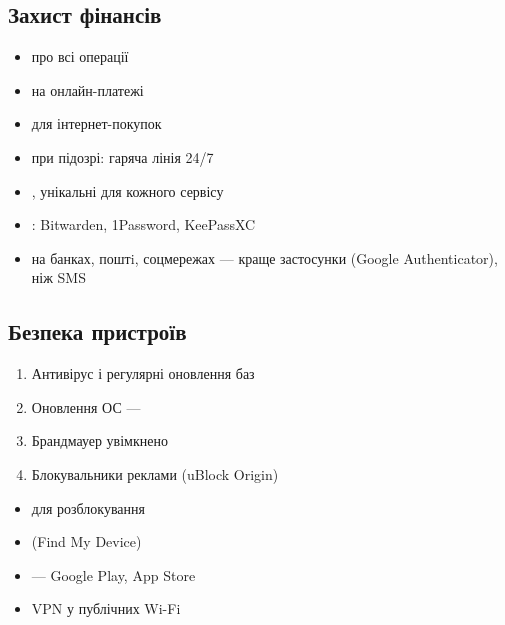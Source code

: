 \subsection*{Захист фінансів}

\begin{itemize}[label=--]
\item {} про всі операції
\item {} на онлайн-платежі
\item {} для інтернет-покупок
\item {} при підозрі: гаряча лінія 24/7
\end{itemize}

\begin{itemize}[label=--]
\item {}, унікальні для кожного сервісу
\item {}: Bitwarden, 1Password, KeePassXC
\item {} на банках, поштi, соцмережах — краще застосунки (Google Authenticator), ніж SMS
\end{itemize}

\subsection*{Безпека пристроїв}

\begin{enumerate}[label=\arabic*)]
\item Антивірус і регулярні оновлення баз
\item Оновлення ОС — 
\item Брандмауер увімкнено
\item Блокувальники реклами (uBlock Origin)
\end{enumerate}

\begin{itemize}[label=--]
\item {} для розблокування
\item {} (Find My Device)
\item {} — Google Play, App Store
\item VPN у публічних Wi-Fi
\end{itemize}

